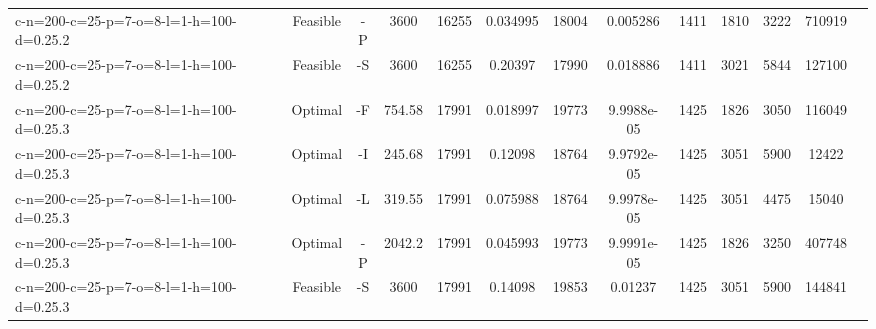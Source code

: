 \documentclass[landscape, a4paper]{article}
\begin{document}
\begin{center}
\begin{tabular}{lcccccccccccc}
c-n=200-c=25-p=7-o=8-l=1-h=100-d=0.25.2 & Feasible & -P & 3600 & 16255 & 0.034995 & 18004 & 0.005286 & 1411 & 1810 & 3222 & 710919 & \\
c-n=200-c=25-p=7-o=8-l=1-h=100-d=0.25.2 & Feasible & -S & 3600 & 16255 & 0.20397 & 17990 & 0.018886 & 1411 & 3021 & 5844 & 127100 & \\
c-n=200-c=25-p=7-o=8-l=1-h=100-d=0.25.3 & Optimal & -F & 754.58 & 17991 & 0.018997 & 19773 & 9.9988e-05 & 1425 & 1826 & 3050 & 116049 & \\
c-n=200-c=25-p=7-o=8-l=1-h=100-d=0.25.3 & Optimal & -I & 245.68 & 17991 & 0.12098 & 18764 & 9.9792e-05 & 1425 & 3051 & 5900 & 12422 & \\
c-n=200-c=25-p=7-o=8-l=1-h=100-d=0.25.3 & Optimal & -L & 319.55 & 17991 & 0.075988 & 18764 & 9.9978e-05 & 1425 & 3051 & 4475 & 15040 & \\
c-n=200-c=25-p=7-o=8-l=1-h=100-d=0.25.3 & Optimal & -P & 2042.2 & 17991 & 0.045993 & 19773 & 9.9991e-05 & 1425 & 1826 & 3250 & 407748 & \\
c-n=200-c=25-p=7-o=8-l=1-h=100-d=0.25.3 & Feasible & -S & 3600 & 17991 & 0.14098 & 19853 & 0.01237 & 1425 & 3051 & 5900 & 144841 & \\
\end{tabular}
\end{center}
\end{document}
